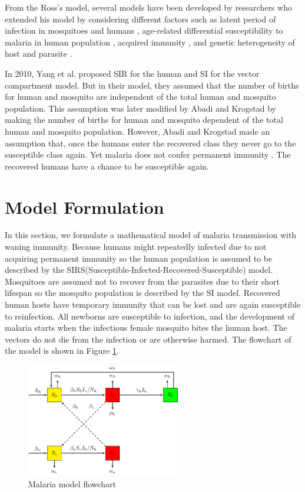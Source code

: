 \documentclass[review]{elsarticle}
\begin{document}
\medskip

From the Ross's model, several models have been developed by researchers who extended his model by considering different factors such as latent period of infection in mosquitoes and humans \cite{12AronMay,Macdonald57}, age-related differential susceptibility to malaria in human population \cite{AronMay,12AronMay,Dietz}, acquired immunity \cite{AronMay,AronJL,Filipe}, and genetic heterogeneity of host and parasite \cite{Gupta1,Gupta2,Hasi,Rodrig,Torre}.

\medskip

In 2010, Yang et al. \cite{Yang} proposed SIR for the human and SI for the vector compartment model. But in their model, they assumed that the number of births for human and mosquito are independent of the total human and mosquito population. This assumption was later modified by Abadi and Krogstad \cite{Gebre} by making the number of births for human and mosquito dependent of the total human and mosquito population. However, Abadi and Krogstad made an assumption that, once the humans enter the recovered class they never go to the susceptible class again. Yet malaria does not confer permanent immunity \cite{Maia}. The recovered humans have a chance to be susceptible again.

\section{Model Formulation}

In this section, we formulate a mathematical model of malaria transmission with waning immunity. Because humans might repeatedly infected due to not acquiring permanent immunity so the human population is assumed to be described by the SIRS(Susceptible-Infected-Recovered-Susceptible) model. Mosquitoes are assumed not to recover from the parasites due to their short lifespan  so the mosquito population is described by the SI model. Recovered human hosts have temporary immunity that can be lost and are again susceptible to reinfection. All newborns are susceptible to infection, and the development of malaria starts when the infectious female mosquito bites the human host. The vectors do not die from the infection or are otherwise harmed. The flowchart of the model is shown in Figure \ref{fig:model}.

\begin{figure}[htb!]
\centering
\includegraphics[width=0.6\textwidth]{model}
\caption{Malaria model flowchart}\label{fig:model}
\end{figure}
\end{document}
